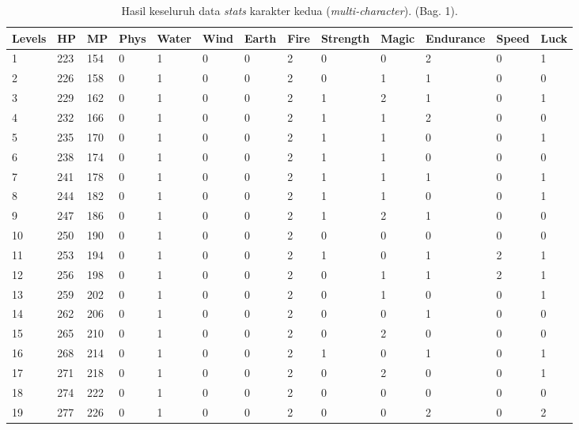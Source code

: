 \begin{sidewaystable}[!h]
	\centering
	\caption{Hasil keseluruh data \textit{stats} karakter kedua (\textit{multi-character}). (Bag. 1).}
	\label{tb:player_all_stats_1_2}
	\vspace{1ex}
	\begin{tabular}{|l|l|l|l|l|l|l|l|l|l|l|l|l|}
		\hline
		\rowcolor[HTML]{C0C0C0} 
		\textbf{Levels} & \textbf{HP} & \textbf{MP} & \textbf{Phys} & \textbf{Water} & \textbf{Wind} & \textbf{Earth} & \textbf{Fire} & \textbf{Strength} & \textbf{Magic} & \textbf{Endurance} & \textbf{Speed} & \textbf{Luck} \\ \hline
		1 & 223 & 154 & 0 & 1 & 0 & 0 & 2 & 0 & 0 & 2 & 0 & 1 \\ \hline
		2 & 226 & 158 & 0 & 1 & 0 & 0 & 2 & 0 & 1 & 1 & 0 & 0 \\ \hline
		3 & 229 & 162 & 0 & 1 & 0 & 0 & 2 & 1 & 2 & 1 & 0 & 1 \\ \hline
		4 & 232 & 166 & 0 & 1 & 0 & 0 & 2 & 1 & 1 & 2 & 0 & 0 \\ \hline
		5 & 235 & 170 & 0 & 1 & 0 & 0 & 2 & 1 & 1 & 0 & 0 & 1 \\ \hline
		6 & 238 & 174 & 0 & 1 & 0 & 0 & 2 & 1 & 1 & 0 & 0 & 0 \\ \hline
		7 & 241 & 178 & 0 & 1 & 0 & 0 & 2 & 1 & 1 & 1 & 0 & 1 \\ \hline
		8 & 244 & 182 & 0 & 1 & 0 & 0 & 2 & 1 & 1 & 0 & 0 & 1 \\ \hline
		9 & 247 & 186 & 0 & 1 & 0 & 0 & 2 & 1 & 2 & 1 & 0 & 0 \\ \hline
		10 & 250 & 190 & 0 & 1 & 0 & 0 & 2 & 0 & 0 & 0 & 0 & 0 \\ \hline
		11 & 253 & 194 & 0 & 1 & 0 & 0 & 2 & 1 & 0 & 1 & 2 & 1 \\ \hline
		12 & 256 & 198 & 0 & 1 & 0 & 0 & 2 & 0 & 1 & 1 & 2 & 1 \\ \hline
		13 & 259 & 202 & 0 & 1 & 0 & 0 & 2 & 0 & 1 & 0 & 0 & 1 \\ \hline
		14 & 262 & 206 & 0 & 1 & 0 & 0 & 2 & 0 & 0 & 1 & 0 & 0 \\ \hline
		15 & 265 & 210 & 0 & 1 & 0 & 0 & 2 & 0 & 2 & 0 & 0 & 0 \\ \hline
		16 & 268 & 214 & 0 & 1 & 0 & 0 & 2 & 1 & 0 & 1 & 0 & 1 \\ \hline
		17 & 271 & 218 & 0 & 1 & 0 & 0 & 2 & 0 & 2 & 0 & 0 & 1 \\ \hline
		18 & 274 & 222 & 0 & 1 & 0 & 0 & 2 & 0 & 0 & 0 & 0 & 0 \\ \hline
		19 & 277 & 226 & 0 & 1 & 0 & 0 & 2 & 0 & 0 & 2 & 0 & 2 \\ \hline

\end{tabular}
\end{sidewaystable}
